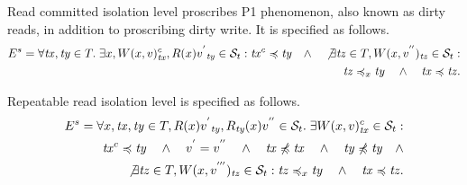 \documentclass[acmlarge, ,11pt]{acmart}
\begin{document}
 \par Read committed isolation level proscribes P1 phenomenon, also known as dirty reads, in addition to proscribing dirty write. It is specified as follows. 
   \begin{align}\label{eqn:readcomm}
\begin{split}
 E^{s} =  \forall \mathit{tx}, \mathit{ty} \in T. \; \exists x, W(x,v)_{\mathit{tx}}^{c}, R(x){v^{'}}_{\mathit{ty}} \in  \mathcal{S}_t: 
  \mathit{tx}^{c} \preccurlyeq {\mathit{ty}} \quad \wedge  \quad \not \exists \mathit{tz} \in T, W(x,v^{''})_{\mathit{tz}} \in  \mathcal{S}_t: \\
   \mathit{tz} \preccurlyeq_x {\mathit{ty}} \quad \wedge \quad \mathit{tx} \preccurlyeq {\mathit{tz}}. 
\end{split}
  \end{align}
  \par Repeatable read isolation level is specified as follows. 
   \begin{align}\label{eqn:repeatread}
\begin{split}
 E^{s} =  \forall x, \mathit{tx}, \mathit{ty} \in T, R(x){v^{'}}_{\mathit{ty}}, R_{\mathit{ty}}(x){v^{''}} \in \mathcal{S}_t. \; \exists W(x,v)_{\mathit{tx}}^{c} \in \mathcal{S}_t: \\ %
\mathit{tx}^{c} \preccurlyeq \mathit{ty} \quad \wedge \quad %
 v^{'} = v^{''} \quad \wedge \quad \mathit{tx} \not \preccurlyeq \mathit{tx} \quad \wedge \quad \mathit{ty} \not \preccurlyeq \mathit{ty} \quad \wedge \\
  \not \exists \mathit{tz} \in T, W(x,v^{'''})_{\mathit{tz}} \in  \mathcal{S}_t: 
   \mathit{tz} \preccurlyeq_x {\mathit{ty}} \quad \wedge \quad \mathit{tx} \preccurlyeq {\mathit{tz}}. %
\end{split}
  \end{align}
\end{document}
